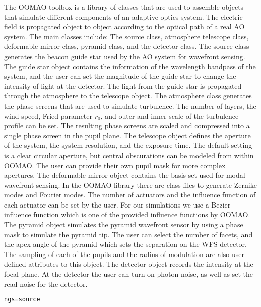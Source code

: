 The OOMAO toolbox is a library of classes that are used to assemble objects that simulate different components of an adaptive optics system. The electric field is propagated object to object according to the optical path of a real AO system. The main classes include: The source class, atmosphere telescope class, deformable mirror class, pyramid class, and the detector class. The source class generates the beacon guide star used by the AO system for wavefront sensing. The guide star object contains the information of the wavelength bandpass of the system, and the user can set the magnitude of the guide star to change the intensity of light at the detector. The light from the guide star is propagated through the atmosphere to the telescope object. The atmosphere class generates the phase screens that are used to simulate turbulence. The number of layers, the wind speed, Fried parameter $r_0$, and outer and inner scale of the turbulence profile can be set. The resulting phase screens are scaled and compressed into a single phase screen in the pupil plane.  The telescope object defines the aperture of the system, the system resolution, and the exposure time. The default setting is a clear circular aperture, but central obscurations can be modeled from within OOMAO. The user can provide their own pupil mask for more complex apertures. The deformable mirror object contains the basis set used for modal wavefront sensing. In the OOMAO library there are class files to generate Zernike modes and Fourier modes. The number of actuators and the influence function of each actuator can be set by the user. For our simulations we use a Bezier influence function which is one of the provided influence functions by OOMAO. The pyramid object simulates the pyramid wavefront sensor by using a phase mask to simulate the pyramid tip. The user can select the number of facets, and the apex angle of the pyramid which sets the separation on the WFS detector. The sampling of each of the pupils and the radius of modulation are also user defined attributes to this object. The detector object records the intensity at the focal plane. At the detector the user can turn on photon noise, as well as set the read noise for the detector. 

\begin{lstlisting}[language=Python, caption=Python example]
ngs=source
\end{lstlisting}







